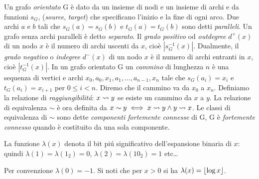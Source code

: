 Un grafo \textit{orientato} G è dato da un insieme di nodi  e un insieme di archi  e da funzioni $s_G$,  (\textit{source}, \textit{target}) che specificano l'inizio e la fine di ogni arco. Due archi $a$ e $b$ tali che $s_G(a) = s_G(b)$ e $t_G(a) = t_G(b)$ sono detti \textit{paralleli}. Un grafo senza archi paralleli è detto \textit{separato}. Il \textit{grado positivo} od \textit{outdegree} $d^+(x)$ di un nodo $x$ è il numero di archi uscenti da $x$, cioè $|s_G^{-1}(x)|$. Dualmente, il \textit{grado negativo} o \textit{indegree} $d^-(x)$ di un nodo $x$ è il numero di archi entranti in $x$, cioè $|t_G^{-1}(x)|$. In un grafo orientato G un \textit{cammino} di lunghezza $n$ è una sequenza di vertici e archi $x_0, a_0, x_1, a_1, \dots, a_{n - 1}, x_n$ tale che $s_G(a_i) = x_i$ e $t_G(a_i) = x_{i + 1}$ per $0 \leq i < n$. Diremo che il cammino va da $x_0$ a $x_n$.
Definiamo la relazione di \textit{raggiungibilitá}: $x \mathrel{\leadsto} y$ se esiste un cammino da $x$ a $y$. La relazione di equivalenza $\sim$ è ora definita da $x \sim y \iff x \mathrel{\leadsto} y \land y \mathrel{\leadsto} x$. Le classi di equivalenza di $\sim$ sono dette \textit{componenti fortemente connesse} di G, G è \textit{fortemente connesso} quando è costituito da una sola componente.

La funzione $\lambda(x)$ denota il bit piú significativo dell'espansione binaria di $x$: quindi $\lambda(1) = \lambda(1_2) = 0$, $\lambda(2) = \lambda(10_2) = 1$ etc\dots

Per convenzione $\lambda(0) = -1$. Si noti che per $x > 0$ si ha $\lambda(x) = \left\lfloor \log{x} \right\rfloor$.
